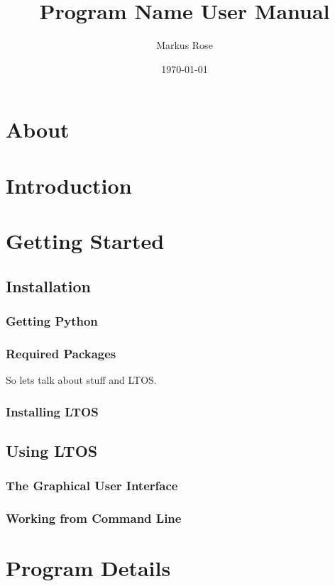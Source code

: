 \documentclass{scrbook}
\author{Markus Rose}
\title{Program Name User Manual}
\date{\today}
\newcommand{\PN}{LTOS}
\begin{document}
\maketitle

\tableofcontents


\chapter{About}

\chapter{Introduction}

\chapter{Getting Started}

\section{Installation}

\subsection{Getting Python}

\subsection{Required Packages}
So lets talk about stuff and \PN.

\subsection{Installing \PN}

\section{Using \PN}

\subsection{The Graphical User Interface}

\subsection{Working from Command Line}

\chapter{Program Details}
\end{document}
